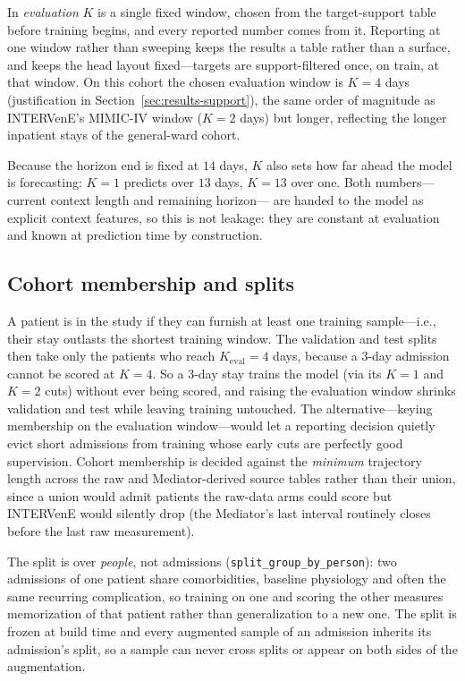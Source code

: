 In \emph{evaluation} $K$ is a single fixed window, chosen from the
target-support table before training begins, and every reported number
comes from it. Reporting at one window rather than sweeping keeps the
results a table rather than a surface, and keeps the head layout
fixed---targets are support-filtered once, on train, at that window. On
this cohort the chosen evaluation window is $K = 4$ days (justification
in Section~\ref{sec:results-support}), the same order of magnitude as
INTERVenE's MIMIC-IV window ($K = 2$ days) but longer, reflecting the
longer inpatient stays of the general-ward cohort.

Because the horizon end is fixed at $14$ days, $K$ also sets how far
ahead the model is forecasting: $K{=}1$ predicts over $13$ days, $K{=}13$
over one. Both numbers---current context length and remaining horizon---
are handed to the model as explicit context features, so this is not
leakage: they are constant at evaluation and known at prediction time by
construction.

\subsection{Cohort membership and splits}

A patient is in the study if they can furnish at least one training
sample---i.e., their stay outlasts the shortest training window. The
validation and test splits then take only the patients who reach
$K_{\mathrm{eval}} = 4$ days, because a $3$-day admission cannot be
scored at $K{=}4$. So a $3$-day stay trains the model (via its $K{=}1$
and $K{=}2$ cuts) without ever being scored, and raising the evaluation
window shrinks validation and test while leaving training untouched.
The alternative---keying membership on the evaluation window---would let
a reporting decision quietly evict short admissions from training whose
early cuts are perfectly good supervision. Cohort membership is decided
against the \emph{minimum} trajectory length across the raw and
Mediator-derived source tables rather than their union, since a union
would admit patients the raw-data arms could score but INTERVenE would
silently drop (the Mediator's last interval routinely closes before the
last raw measurement).

The split is over \emph{people}, not admissions
(\texttt{split\_group\_by\_person}): two admissions of one patient share
comorbidities, baseline physiology and often the same recurring
complication, so training on one and scoring the other measures
memorization of that patient rather than generalization to a new one.
The split is frozen at build time and every augmented sample of an
admission inherits its admission's split, so a sample can never cross
splits or appear on both sides of the augmentation.

